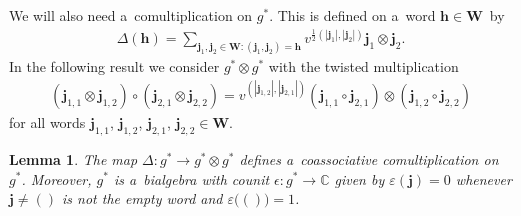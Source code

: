 \documentclass[11pt]{article}
\numberwithin{equation}{section}
\newtheorem{Lemma}[Theorem]{Lemma}
\begin{document}
We will also need a~comultiplication on $g^*$.
This is def\/ined on a~word $\mathbf{h}\in\mathbf{W}$~by
\begin{gather*}
\Delta(\mathbf{h})=\sum\limits_{\mathbf{j}_1,\mathbf{j}_2\in\mathbf{W}:(\mathbf{j}_1,\mathbf{j}_2)=\mathbf{h}}
v^{\frac{1}{2}(|\mathbf{j}_1|,|\mathbf{j}_2|)}\mathbf{j}_1\otimes\mathbf{j}_2.
\end{gather*}
In the following result we consider $g^*\otimes g^*$ with the twisted multiplication
\begin{gather*}
(\mathbf{j}_{1,1}\otimes\mathbf{j}_{1,2})\circ(\mathbf{j}_{2,1}\otimes\mathbf{j}_{2,2})
=v^{(|\mathbf{j}_{1,2}|,|\mathbf{j}_{2,1}|)}(\mathbf{j}_{1,1}\circ\mathbf{j}_{2,1})\otimes(\mathbf{j}_{1,2}\circ\mathbf{j}_{2,2})
\end{gather*}
for all words $\mathbf{j}_{1,1}$, $\mathbf{j}_{1,2}$, $\mathbf{j}_{2,1}$, $\mathbf{j}_{2,2}\in\mathbf{W}$. %
\begin{Lemma}
The map $\Delta:g^*\to g^*\otimes g^*$ defines a~coassociative comultiplication on $g^*$.
Moreover, $g^*$ is a~bialgebra with counit $\epsilon:g^*\to\mathbb{C}$ given by $\varepsilon(\mathbf{j})=0$ whenever
$\mathbf{j}\ne()$ is not the empty word and $\varepsilon\big(()\big)=1$.
\end{Lemma}
\end{document}
